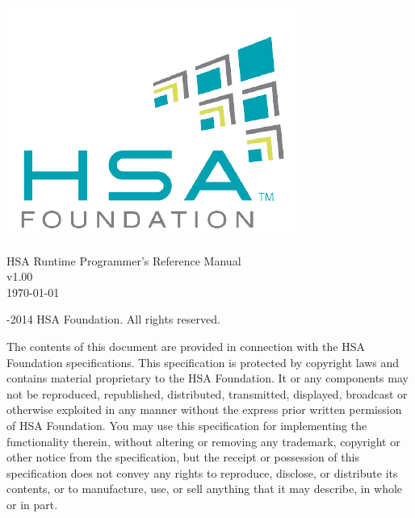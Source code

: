 \documentclass[final,oneside]{book}
\newcommand{\doctitle}{HSA Runtime Programmer's Reference Manual}
\begin{document}
\providecommand{\DIFadd}[1]{{\protect\color{Cerulean}#1}}
\renewcommand{\DIFadd}[1]{{\protect\color{Cerulean}#1}}


\begin{titlepage}
\includegraphics[width=.4\textwidth]{fig/foundation.png}
\vspace*{7cm}
\begin{center}
{\Large \doctitle\\[1ex]\large v1.00}\\ %
\vspace*{1cm}
\vspace*{0.5cm}
{\small \today}
\end{center}
\end{titlepage}
\thispagestyle{empty} {-2014 HSA Foundation. All rights
  reserved.}


The contents of this document are provided in connection with the HSA Foundation
specifications. This specification is protected by copyright laws and contains
material proprietary to the HSA Foundation. It or any components may not be
reproduced, republished, distributed, transmitted, displayed, broadcast or
otherwise exploited in any manner without the express prior written permission
of HSA Foundation. You may use this specification for implementing the
functionality therein, without altering or removing any trademark, copyright or
other notice from the specification, but the receipt or possession of this
specification does not convey any rights to reproduce, disclose, or distribute
its contents, or to manufacture, use, or sell anything that it may describe, in
whole or in part.
\end{document}
